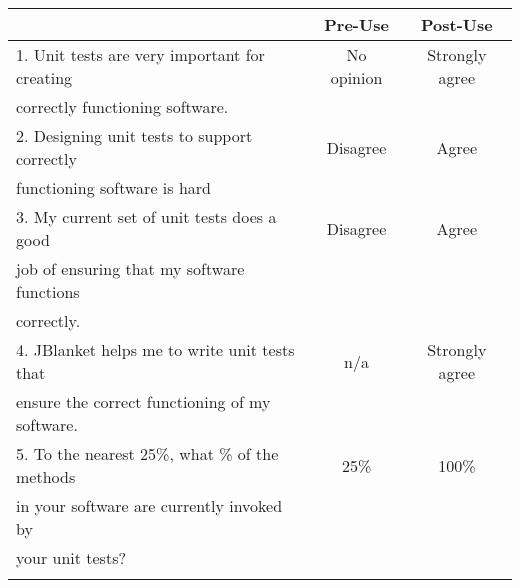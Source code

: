 \begin{tabular}{lcc} \\
 & {\bf Pre-Use} & {\bf Post-Use} \\ \hline
1. Unit tests are very important for creating & No opinion & Strongly agree \\
   correctly functioning software. \\ \hline

2. Designing unit tests to support correctly & Disagree & Agree \\
   functioning software is hard\\ \hline

3. My current set of unit tests does a good & Disagree & Agree \\
   job of ensuring that my software functions \\
   correctly.\\ \hline

4. JBlanket helps me to write unit tests that & n/a & Strongly agree \\
   ensure the correct functioning of my software.\\ \hline

5. To the nearest 25\%, what \% of the methods & 25\% & 100\% \\
   in your software are currently invoked by \\
   your unit tests?\\ \hline
\\
\end{tabular}

